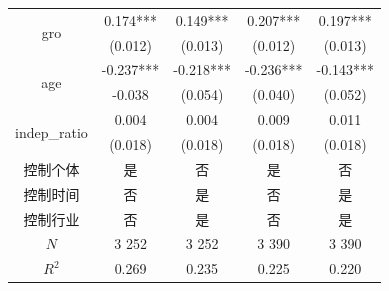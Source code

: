 \documentclass{beamer}	%
\theoremstyle{plain}
\theoremstyle{definition}
\theoremstyle{remark}
\numberwithin{equation}{section}
\begin{document}
\begin{frame}
\begin{table}[htbp]
\begin{tabular}{ccccc}
			\multirow{2}[0]{*}{gro}      &                   0.174***                   &                   0.149***                   &                    0.207***                    &                    0.197***                    \\
			&                   (0.012)                    &                   (0.013)                    &                    (0.012)                     &                    (0.013)                     \\
			\multirow{2}[0]{*}{age}      &                  -0.237***                   &                  -0.218***                   &                   -0.236***                    &                   -0.143***                    \\
			&                   -0.038                    &                   (0.054)                    &                    (0.040)                     &                    (0.052)                     \\
			\multirow{2}[0]{*}{indep\_ratio} &                    0.004                     &                    0.004                     &                     0.009                      &                     0.011                      \\
			&                   (0.018)                    &                   (0.018)                    &                    (0.018)                     &                    (0.018)                     \\
			控制个体               &                      是                       &                      否                       &                       是                        &                       否                        \\
			控制时间               &                      否                       &                      是                       &                       否                        &                       是                        \\
			控制行业               &                      否                       &                      是                       &                       否                        &                       是                        \\
			$N$                 &                    3 252                     &                    3 252                     &                     3 390                      &                     3 390                      \\
			$R^2$                 &                    0.269                     &                    0.235                     &                     0.225                      &                     0.220                      \\ \bottomrule
		\end{tabular}%
	\end{table}%
\end{frame}
\end{document}
